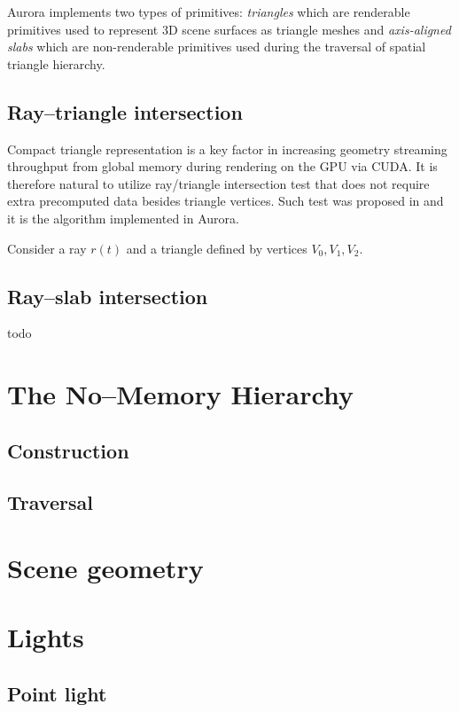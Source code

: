Aurora implements two types of primitives: \emph{triangles} which are renderable primitives used to represent 3D scene surfaces as triangle meshes and \emph{axis-aligned slabs} which are non-renderable primitives used during the traversal of spatial triangle hierarchy. 

\subsection{Ray--triangle intersection}
Compact triangle representation is a key factor in increasing geometry streaming throughput from global memory during rendering on the GPU via CUDA. It is therefore natural to utilize ray/triangle intersection test that does not require extra precomputed data besides triangle vertices. Such test was proposed in \cite{mt97} and it is the algorithm implemented in Aurora.

Consider a ray $r(t)$ and a triangle defined by vertices $V_{0}, V_{1}, V_{2}$.
\vfill

\subsection{Ray--slab intersection}
todo

\section{The No--Memory Hierarchy}

\subsection{Construction}

\subsection{Traversal}

\section{Scene geometry}

\section{Lights}

\subsection{Point light}

